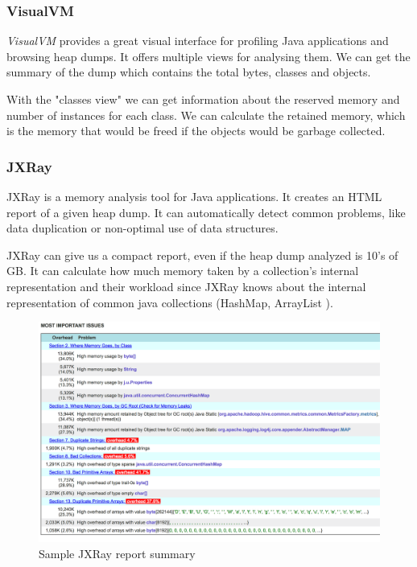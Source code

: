 \subsubsection{VisualVM}
\textit{VisualVM} provides a great visual interface for profiling Java applications and browsing heap dumps. It offers multiple views for analysing them. We can get the summary of the dump which contains the total bytes, classes and objects. 

With the "classes view" we can get information about the reserved memory and number of instances for each class. We can calculate the retained memory, which is the memory that would be freed if the objects would be garbage collected.

\subsubsection{JXRay}
JXRay \cite{jxray} is a memory analysis tool for Java applications. It creates an HTML report of a given heap dump. It can automatically detect common problems, like data duplication or non-optimal use of data structures. 

JXRay can give us a compact report, even if the heap dump analyzed is 10's of GB. It can calculate how much memory taken by a collection's internal representation and their workload since JXRay knows about the internal representation of common java collections (HashMap, ArrayList \etc).

\begin{figure}[H]
	\includegraphics[width=150mm, keepaspectratio]{figures/jxray_sample.png}
	\centering
	\caption{Sample JXRay report summary}
\end{figure}

